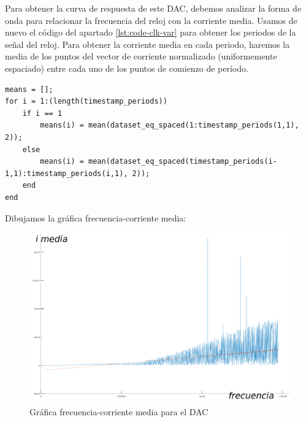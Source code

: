 \documentclass[12pt]{report} %
\begin{document}
	Para obtener la curva de respuesta de este DAC, debemos analizar la forma de onda para relacionar la frecuencia del reloj con la corriente media. Usamos de nuevo el código del apartado \ref{lst:code-clk-var} para obtener los periodos de la señal del reloj. Para obtener la corriente media en cada periodo, haremos la media de los puntos del vector de corriente normalizado (uniformemente espaciado) entre cada uno de los puntos de comienzo de período.
	
\begin{lstlisting}[caption={Código en Matlab/Octave para el cálculo de la corriente media por cada periodo}, label={code-dac-i-mean}]
means = [];
for i = 1:(length(timestamp_periods))
	if i == 1
		means(i) = mean(dataset_eq_spaced(1:timestamp_periods(1,1), 2));
	else
		means(i) = mean(dataset_eq_spaced(timestamp_periods(i-1,1):timestamp_periods(i,1), 2));
	end
end
\end{lstlisting}

	Dibujamos la gráfica frecuencia-corriente media:
	
	\begin{figure}[H]
		\includegraphics[width=1\textwidth]{dac-sim-graph.png}
		\caption[Gráfica frecuencia-corriente media para el DAC]{Gráfica frecuencia-corriente media para el DAC}
		\label{fig:dac-sim-graph.png}
	\end{figure}
\end{document}
